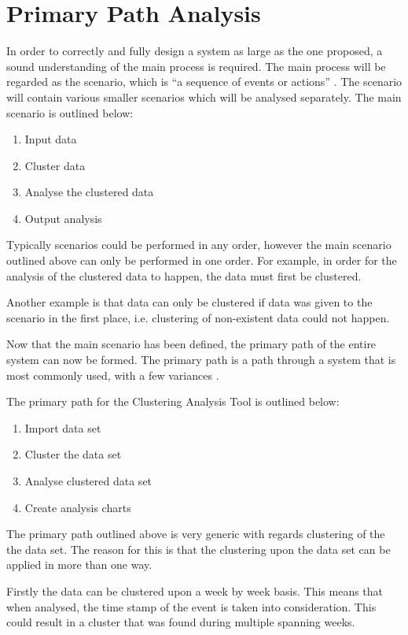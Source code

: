 \section{Primary Path Analysis}

In order to correctly and fully design a system as large as the one proposed, 
a sound understanding of the main process is required. The main process will 
be regarded as the scenario, which is ``a sequence of events or actions'' 
\citep{lunn03}. The scenario will contain various smaller scenarios which will 
be analysed separately. The main scenario is outlined below:

\begin{enumerate}
  \item Input data
  \item Cluster data
  \item Analyse the clustered data
  \item Output analysis
\end{enumerate}

Typically scenarios could be performed in any order, however the main scenario
outlined above can only be performed in one order. For example, in order for 
the analysis of the clustered data to happen, the data must first be clustered.

Another example is that data can only be clustered if data was given to the 
scenario in the first place, i.e. clustering of non-existent data could not 
happen. 

Now that the main scenario has been defined, the primary path of the entire 
system can now be formed. The primary path is a path through a system that is 
most commonly used, with a few variances \citep{lunn03}. 

The primary path for the Clustering Analysis Tool is outlined below:

\begin{enumerate}
  \item Import data set
  \item Cluster the data set
  \item Analyse clustered data set
  \item Create analysis charts
\end{enumerate}

The primary path outlined above is very generic with regards clustering of the 
the data set. The reason for this is that the clustering upon the data set can 
be applied in more than one way. 

Firstly the data can be clustered upon a week by week basis. This means that 
when analysed, the time stamp of the event is taken into consideration. This 
could result in a cluster that was found during multiple spanning weeks.

